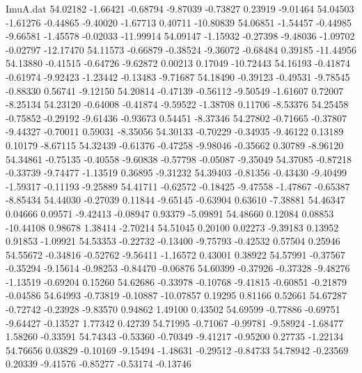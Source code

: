 \begin{filecontents}{ImuA.dat}
  54.02182   -1.66421   -0.68794   -9.87039   -0.73827    0.23919   -9.01464
  54.04503   -1.61276   -0.44865   -9.40020   -1.67713    0.40711  -10.80839
  54.06851   -1.54457   -0.44985   -9.66581   -1.45578   -0.02033  -11.99914
  54.09147   -1.15932   -0.27398   -9.48036   -1.09702   -0.02797  -12.17470
  54.11573   -0.66879   -0.38524   -9.36072   -0.68484    0.39185  -11.44956
  54.13880   -0.41515   -0.64726   -9.62872    0.00213    0.17049  -10.72443
  54.16193   -0.41874   -0.61974   -9.92423   -1.23442   -0.13483   -9.71687
  54.18490   -0.39123   -0.49531   -9.78545   -0.88330    0.56741   -9.12150
  54.20814   -0.47139   -0.56112   -9.50549   -1.61607    0.72007   -8.25134
  54.23120   -0.64008   -0.41874   -9.59522   -1.38708    0.11706   -8.53376
  54.25458   -0.75852   -0.29192   -9.61436   -0.93673    0.54451   -8.37346
  54.27802   -0.71665   -0.37807   -9.44327   -0.70011    0.59031   -8.35056
  54.30133   -0.70229   -0.34935   -9.46122    0.13189    0.10179   -8.67115
  54.32439   -0.61376   -0.47258   -9.98046   -0.35662    0.30789   -8.96120
  54.34861   -0.75135   -0.40558   -9.60838   -0.57798   -0.05087   -9.35049
  54.37085   -0.87218   -0.33739   -9.74477   -1.13519    0.36895   -9.31232
  54.39403   -0.81356   -0.43430   -9.40499   -1.59317   -0.11193   -9.25889
  54.41711   -0.62572   -0.18425   -9.47558   -1.47867   -0.65387   -8.85434
  54.44030   -0.27039    0.11844   -9.65145   -0.63904    0.63610   -7.38881
  54.46347    0.04666    0.09571   -9.42413   -0.08947    0.93379   -5.09891
  54.48660    0.12084    0.08853  -10.44108    0.98678    1.38414   -2.70214
  54.51045    0.20100    0.02273   -9.39183    0.13952    0.91853   -1.09921
  54.53353   -0.22732   -0.13400   -9.75793   -0.42532    0.57504    0.25946
  54.55672   -0.34816   -0.52762   -9.56411   -1.16572    0.43001    0.38922
  54.57991   -0.37567   -0.35294   -9.15614   -0.98253   -0.84470   -0.06876
  54.60399   -0.37926   -0.37328   -9.48276   -1.13519   -0.69204    0.15260
  54.62686   -0.33978   -0.10768   -9.41815   -0.60851   -0.21879   -0.04586
  54.64993   -0.73819   -0.10887  -10.07857    0.19295    0.81166    0.52661
  54.67287   -0.72742   -0.23928   -9.83570    0.94862    1.49100    0.43502
  54.69599   -0.77886   -0.69751   -9.64427   -0.13527    1.77342    0.42739
  54.71995   -0.71067   -0.99781   -9.58924   -1.68477    1.58260   -0.33591
  54.74343   -0.53360   -0.70349   -9.41217   -0.95200    0.27735   -1.22134
  54.76656    0.03829   -0.10169   -9.15494   -1.48631   -0.29512   -0.84733
  54.78942   -0.23569    0.20339   -9.41576   -0.85277   -0.53174   -0.13746

\end{filecontents}
